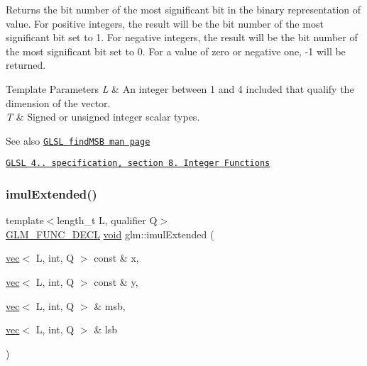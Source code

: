 Returns the bit number of the most significant bit in the binary representation of value. For positive integers, the result will be the bit number of the most significant bit set to 1. For negative integers, the result will be the bit number of the most significant bit set to 0. For a value of zero or negative one, -\/1 will be returned.


\begin{DoxyTemplParams}{Template Parameters}
{\em L} & An integer between 1 and 4 included that qualify the dimension of the vector. \\
\hline
{\em T} & Signed or unsigned integer scalar types.\\
\hline
\end{DoxyTemplParams}
\begin{DoxySeeAlso}{See also}
\href{http://www.opengl.org/sdk/docs/manglsl/xhtml/findMSB.xml}{\tt G\+L\+SL find\+M\+SB man page} 

\href{http://www.opengl.org/registry/doc/GLSLangSpec.4.20.8.pdf}{\tt G\+L\+SL 4.. specification, section 8. Integer Functions} 
\end{DoxySeeAlso}
\mbox{\label{group__core__func__integer_gac0c510a70e852f57594a9141848642e3}} 
\subsubsection{\texorpdfstring{imul\+Extended()}{imulExtended()}}
{\footnotesize\ttfamily template$<$length\+\_\+t L, qualifier Q$>$ \\
\hyperlink{setup_8hpp_ab2d052de21a70539923e9bcbf6e83a51}{G\+L\+M\+\_\+\+F\+U\+N\+C\+\_\+\+D\+E\+CL} \hyperlink{_s_d_l__opengles2__gl2ext_8h_ae5d8fa23ad07c48bb609509eae494c95}{void} glm\+::imul\+Extended (\begin{DoxyParamCaption}\item[{\hyperlink{structglm_1_1vec}{vec}$<$ L, int, Q $>$ const \&}]{x,  }\item[{\hyperlink{structglm_1_1vec}{vec}$<$ L, int, Q $>$ const \&}]{y,  }\item[{\hyperlink{structglm_1_1vec}{vec}$<$ L, int, Q $>$ \&}]{msb,  }\item[{\hyperlink{structglm_1_1vec}{vec}$<$ L, int, Q $>$ \&}]{lsb }\end{DoxyParamCaption})}

